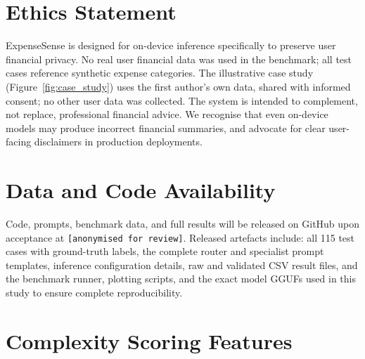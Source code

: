 \documentclass[11pt,twocolumn]{article}
\begin{document}
\section*{Ethics Statement}

ExpenseSense is designed for on-device inference specifically to preserve user financial privacy.
No real user financial data was used in the benchmark; all test cases reference synthetic expense categories.
The illustrative case study (Figure~\ref{fig:case_study}) uses the first author's own data, shared with informed consent; no other user data was collected.
The system is intended to complement, not replace, professional financial advice.
We recognise that even on-device models may produce incorrect financial summaries, and advocate for clear user-facing disclaimers in production deployments.

\section*{Data and Code Availability}

Code, prompts, benchmark data, and full results will be released on GitHub upon acceptance at \texttt{[anonymised for review]}.
Released artefacts include: all 115 test cases with ground-truth labels, the complete router and specialist prompt templates, inference configuration details, raw and validated CSV result files, and the benchmark runner, plotting scripts, and the exact model GGUFs used in this study to ensure complete reproducibility.



\appendix\onecolumn

\section{Complexity Scoring Features}
\label{sec:complexity_appendix}
\end{document}
